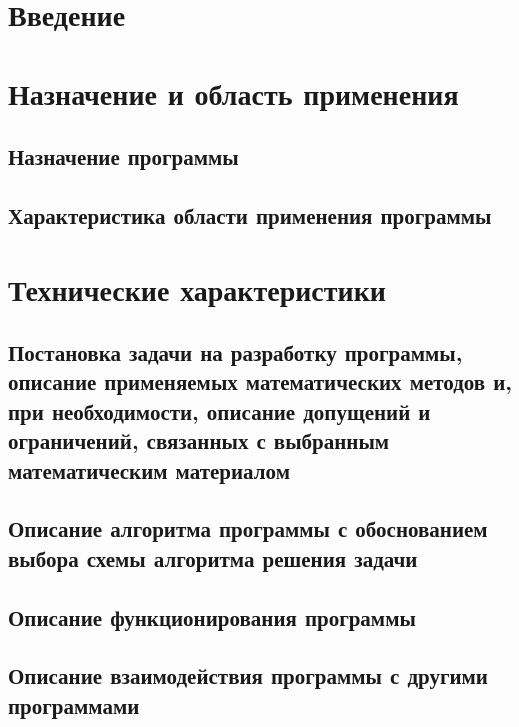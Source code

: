 \documentclass[allcolors=black]{article}
\begin{document}
\makeTitlePage

\tableofcontents

\section{Введение}

\section{Назначение и область применения}
\subsection{Назначение программы}
    
\subsection{Характеристика области применения программы}

\section{Технические характеристики}
\subsection{Постановка задачи на разработку программы, описание применяемых математических методов и, при необходимости, описание допущений и ограничений, связанных с выбранным математическим материалом}

\subsection{Описание алгоритма программы с обоснованием выбора схемы алгоритма решения задачи}

    
\subsection{Описание функционирования программы}

\subsection{Описание взаимодействия программы с другими программами}
\end{document}
